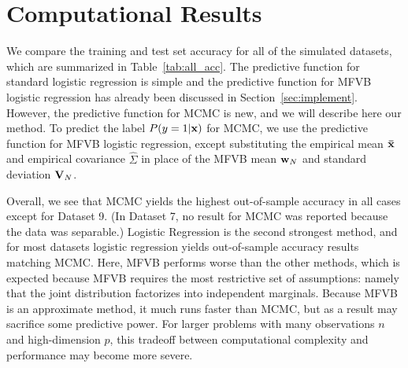 
\section{Computational Results}\label{sec:comp}

We compare the training and test set accuracy for all of the simulated datasets, which are summarized in Table~\ref{tab:all_acc}.
The predictive function for standard logistic regression is simple and the predictive function for MFVB logistic regression has already been discussed in Section~\ref{sec:implement}.  However, the predictive function for MCMC is new, and we will describe here our method.  To predict the label $P(y=1|\boldsymbol{\mathbf{x}})$ for MCMC, we use the predictive function for MFVB logistic regression, except substituting the empirical mean $\boldsymbol{\mathbf{\bar x}}$ and empirical covariance ${\hat \Sigma}$ in place of the MFVB mean $\boldsymbol{\mathbf{w}}_N$ and standard deviation $\boldsymbol{\mathbf{V}}_N$.
 
Overall, we see that MCMC yields the highest out-of-sample accuracy in all cases except for Dataset 9.  (In Dataset 7, no result for
MCMC was reported because the data was separable.)  Logistic Regression is the second strongest method, and for most datasets logistic regression yields out-of-sample accuracy results matching MCMC.  Here, MFVB performs worse than the other methods, which is expected because MFVB requires the most restrictive set of assumptions: namely that the joint distribution factorizes into independent marginals.  Because MFVB is an approximate method, it much runs faster than MCMC, but as a result may sacrifice some predictive power.  For larger problems with many observations $n$ and high-dimension $p$, this tradeoff between computational complexity and performance may become more severe.  


